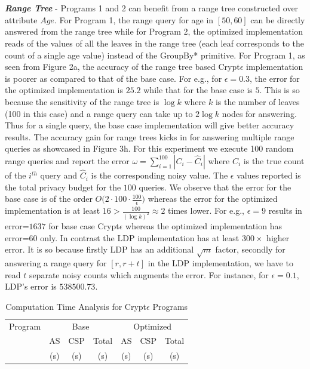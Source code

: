 \\\\\textit{\textbf{Range Tree}} - Programs 1 and 2 can benefit from a range tree constructed over attribute $Age$. For Program 1, the range query for age in $[50,60]$ can be directly answered from the range tree while for Program 2, the optimized implementation reads of the values of all the leaves in  the range tree (each leaf corresponds to the count of a single age value) instead of the \textsf{GroupBy*} primitive. For Program 1, as seen from Figure 2a, the accuracy of the range tree based Crypt$\epsilon$ implementation is poorer as compared to that of the base case. For e.g., for $\epsilon=0.3$, the error for the optimized implementation is $25.2$ while that for the base case is $5$. This is so because the sensitivity of the range tree is $\log k$ where $k$ is the number of leaves (100 in this case) and a range query can take up to $2 \log k$ nodes for answering. Thus for a single query, the base case implementation will give better accuracy results. The accuracy gain for range trees kicks in for answering multiple range queries as showcased in Figure 3h.  For this experiment we execute 100 random range queries and report the error $\omega=\sum_{i=1}^100|C_i-\hat{C}_i|$ where $C_i$ is the true count of the $i^{th}$ query and $\hat{C}_i$ is the corresponding noisy value. The $\epsilon$ values reported is the total privacy budget for the $100$ queries. We observe that the error for the base case is of the order $O\big(2\cdot100\cdot\frac{100}{\epsilon}\big)$ whereas the error for the optimized implementation is at least $16 > \frac{100}{(\log k)^2}\approx 2 $ times lower.  For e.g., $\epsilon=9$ results in error=$1637$ for base case Crypt$\epsilon$ whereas the optimized implementation has error=$60$ only. In contrast the \textsf{LDP} implementation has at least $300\times$ higher error. It is so because firstly \textsf{LDP} has an additional $\sqrt{m}$ factor, secondly for answering a range query for $[r,r+t]$ in the \textsf{LDP} implementation, we have to read $t$ separate noisy counts which augments the error. For instance, for $\epsilon=0.1$, \textsf{LDP}'s error is $538500.73$. \begin{table}[ht]
\caption{Computation Time Analysis for Crypt$\epsilon$ Programs}
\centering
\begin{tabular}{c c c c c c c}
\toprule
Program &  \multicolumn{3}{c}{Base} & \multicolumn{3}{c}{Optimized} \\ 
 & AS &  CSP & Total & AS & CSP & Total \\ &(s)&(s)&(s)&(s)&(s)&(s)\\ %

\end{tabular}
\end{table}
